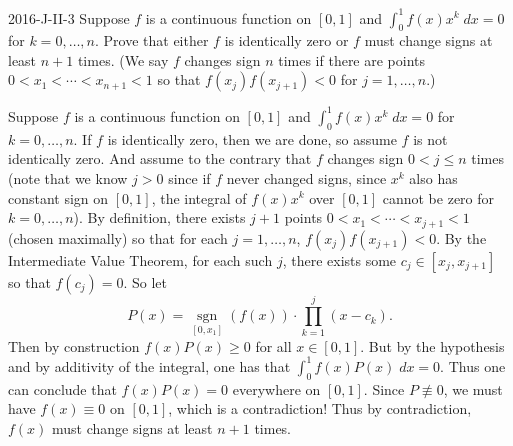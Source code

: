 \documentclass{article}
\begin{document}
	\begin{prb}{2016-J-II-3}
		Suppose $f$ is a continuous function on $[0,1]$ and $\int_{0}^{1}f(x)x^{k}\;dx =0$ for $k = 0,\ldots, n$. Prove that either $f$ is identically zero or $f$ must change signs at least $n + 1$ times. (We say $f$ changes sign $n$ times if there are points $0 < x_1 < \dotsm < x_{n + 1} < 1$ so that $f(x_j)f(x_{j + 1}) < 0$ for $j = 1, \ldots, n$.)
	\end{prb}
	Suppose $f$ is a continuous function on $[0,1]$ and $\int_{0}^{1}f(x)x^{k}\;dx = 0$ for $k = 0, \ldots, n$. If $f$ is identically zero, then we are done, so assume $f$ is not identically zero. And assume to the contrary that $f$ changes sign $0 < j \leq n$ times (note that we know $j > 0$ since if $f$ never changed signs, since $x^{k}$ also has constant sign on $[0,1]$, the integral of $f(x)x^k$ over $[0,1]$ cannot be zero for $k =0, \ldots, n$). By definition, there exists $j + 1$ points $0 < x_1 < \dotsm < x_{j + 1} < 1$ (chosen maximally) so that for each $j = 1, \ldots, n$, $f(x_j)f(x_{j + 1}) < 0$. By the Intermediate Value Theorem, for each such $j$, there exists some $c_{j} \in [x_{j}, x_{j + 1}]$ so that $f(c_{j}) = 0$. So let 
	\begin{equation*}
		P(x) = \operatorname{sgn}\limits_{[0,x_1]}(f(x)) \cdot \prod_{k = 1}^{j}(x - c_{k}). 
	\end{equation*}
	Then by construction $f(x)P(x) \geq 0$ for all $x \in [0,1]$. But by the hypothesis and by additivity of the integral, one has that $\int_{0}^{1}f(x)P(x)\;dx = 0$. Thus one can conclude that $f(x)P(x) = 0$ everywhere on $[0,1]$. Since $P \not\equiv 0$, we must have $f(x) \equiv 0$ on $[0,1]$, which is a contradiction! Thus by contradiction, $f(x)$ must change signs at least $n + 1$ times. 
	 
\end{document}
